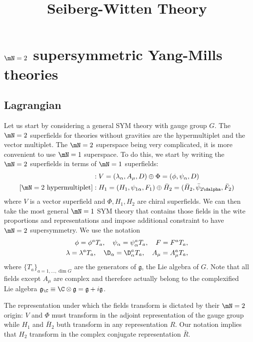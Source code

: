 \documentclass{worksheetclass}
\title{Seiberg-Witten Theory}
\begin{document}
\maketitle

\tableofcontents

\section{$\mN=2$ supersymmetric Yang-Mills theories}

    \subsection{Lagrangian}

        Let us start by considering a general SYM theory with gauge group $G$. The $\mN=2$ superfields for theories without gravities are the hypermultiplet and the vector multiplet. The $\mN=2$ superspace being very complicated, it is more convenient to use $\mN=1$ superspace. To do this, we start by writing the $\mN=2$ superfields in terms of $\mN=1$ superfields:
        \begin{align}
            [\mN=2 \text{ vector multiplet}] &: V=(\lambda_\alpha,A_\mu,D)\oplus \Phi=(\phi,\psi_\alpha,D)\\
            [\mN=2 \text{ hypermultiplet}] &: H_1=(H_1,\psi_{1\alpha},F_1)\oplus \bar{H}_2=(\bar{H}_2,\bar{\psi}_{2\dalpha},\bar{F}_2)
        \end{align}
        where $V$ is a vector superfield and $\Phi,H_1,H_2$ are chiral superfields. We can then take the most general $\mN=1$ SYM theory that contains those fields in the wite proportions and representations and impose additional constraint to have $\mN=2$ supersymmetry. We use the notation
        \begin{align}
            \phi=\phi^a T_a,\quad \psi_\alpha=\psi^a_\alpha T_a,\quad F=F^a T_a,\\
            \lambda=\lambda^a T_a,\quad \D_\alpha=\D^a_\alpha T_a,\quad A_\mu=A^a_\mu T_a,
        \end{align}
        where $\{T_a\}_{a=1,\dots,\dim G}$ are the generators of $\mathfrak{g}$, the Lie algebra of $G$. Note that all fields except $A_\mu$ are complex and therefore actually belong to the complexified Lie algebra $\mathfrak{g}_\C\equiv\C\otimes\mathfrak{g}=\mathfrak{g}+i\mathfrak{g}$.
        
        The representation under which the fields transform is dictated by their $\mN=2$ origin: $V$ and $\Phi$ must transform in the adjoint representation of the gauge group while $H_1$ and $\bar{H}_2$ buth transform in any representation $R$. Our notation implies that $H_2$ transform in the complex conjugate representation $\bar{R}$.
\end{document}
